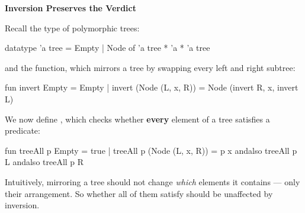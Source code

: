 \newpage
{}

\textbf{Inversion Preserves the Verdict}

Recall the type of polymorphic trees:
\begin{codeblock}
  datatype 'a tree = Empty | Node of 'a tree * 'a * 'a tree
\end{codeblock}

and the  function, which mirrors a tree by swapping every left and
right subtree:
\begin{codeblock}
  fun invert Empty = Empty
    | invert (Node (L, x, R)) = Node (invert R, x, invert L)
\end{codeblock}

We now define , which checks whether \textbf{every} element of a
tree satisfies a predicate:
\begin{codeblock}
  fun treeAll p Empty = true
    | treeAll p (Node (L, x, R)) =
        p x andalso treeAll p L andalso treeAll p R
\end{codeblock}

Intuitively, mirroring a tree should not change \textit{which} elements it
contains --- only their arrangement. So whether all of them satisfy 
should be unaffected by inversion.

